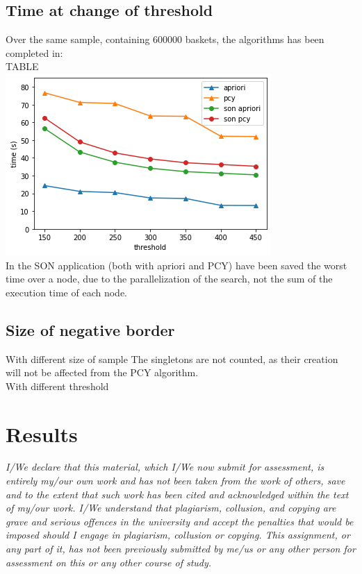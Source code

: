 \documentclass[14pt]{extarticle}
\begin{document}
\subsection{Time at change of threshold}
Over the same sample, containing 600000 baskets, the algorithms has been completed in:\\
TABLE\\
\includegraphics[scale=1]{times.png}
\\
In the SON application (both with apriori and PCY) have been saved the worst time over a node, due to the parallelization of the search, not the sum of the execution time of each node.
\subsection{Size of negative border}
With different size of sample
The singletons are not counted, as their creation will not be affected from the PCY algorithm.\\

With different threshold
\section{Results}
{\it I/We declare that this material, which I/We now submit for assessment, is entirely my/our own work and has not been taken from the work of others, save and to the extent that such work has been cited and acknowledged within the text of my/our work. I/We understand that plagiarism, collusion, and copying are grave and serious offences in the university and accept the penalties that would be imposed should I engage in plagiarism, collusion or copying. This assignment, or any part of it, has not been previously submitted by me/us or any other person for assessment on this or any other course of study.}

\end{document}
